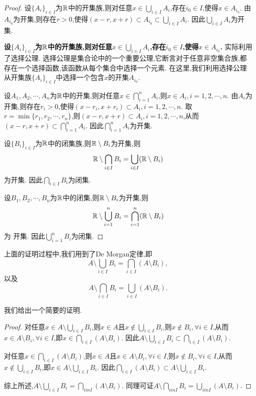 \begin{proof}
    设$\{ A_i \}_{i \in I}$为$\mathbb{R}$中的开集族,则对任意$x \in \bigcup_{i \in I} A_i$,存在$i_0 \in I$,使得$x \in A_{i_0}$. 由$A_{i_0}$为开集,则存在$r > 0$,使得$(x-r,x+r) \subset A_{i_0} \subset \bigcup_{i \in I} A_i$. 因此$\bigcup_{i \in I} A_i$为开集.

\begin{remark}
    \textbf{设$\{ A_i \}_{i \in I}$为$\mathbb{R}$中的开集族,则对任意$x \in \bigcup_{i \in I} A_i$,存在$i_0 \in I$,使得$x \in A_{i_0}$.} 实际利用了选择公理. 选择公理是集合论中的一个重要公理,它断言对于任意非空集合族,都存在一个选择函数,该函数从每个集合中选择一个元素. 在这里,我们利用选择公理从开集族$\{ A_i \}_{i \in I}$中选择一个包含$x$的开集$A_{i_0}$.    
\end{remark}

    设$A_1,A_2,\cdots,A_n$为$\mathbb{R}$中的开集,则对任意$x \in \bigcap_{i=1}^n A_i$,则$x \in A_i, i=1,2,\cdots,n$. 由$A_i$为开集,则存在$r_i > 0$,使得$(x-r_i,x+r_i) \subset A_i, i=1,2,\cdots,n$. 取$r = \min\{r_1,r_2,\cdots,r_n\}$,则$(x-r,x+r) \subset A_i, i=1,2,\cdots,n$,从而$(x-r,x+r) \subset \bigcap_{i=1}^n A_i$. 因此$\bigcap_{i=1}^n A_i$为开集.

    设$\{ B_i \}_{i \in I}$为$\mathbb{R}$中的闭集族,则$\mathbb{R} \setminus B_i$为开集,则$$\mathbb{R} \setminus \bigcap_{i \in I} B_i = \bigcup_{i \in I} (\mathbb{R} \setminus B_i)$$为开集. 因此$\bigcap_{i \in I} B_i$为闭集.

    设$B_1,B_2,\cdots,B_n$为$\mathbb{R}$中的闭集,则$\mathbb{R} \setminus B_i$为开集,则$$\mathbb{R} \setminus \bigcup_{i=1}^n B_i = \bigcap_{i=1}^n (\mathbb{R} \setminus B_i)$$为
    开集. 因此$\bigcup_{i=1}^n B_i$为闭集.
\end{proof}


上面的证明过程中,我们用到了De Morgan定律,即$$A \setminus \bigcup_{i \in I} B_i = \bigcap_{i \in I} (A \setminus B_i),$$以及$$A \setminus \bigcap_{i \in I} B_i = \bigcup_{i \in I} (A \setminus B_i).$$

我们给出一个简要的证明.
\begin{proof}
    对任意$x \in A \setminus \bigcup_{i \in I} B_i$,则$x \in A$且$x \notin \bigcup_{i \in I} B_i$,则$x \notin B_i, \forall i \in I$,从而$x \in A \setminus B_i, \forall i \in I$,即$x \in \bigcap_{i \in I} (A \setminus B_i)$. 因此$A \setminus \bigcup_{i \in I} B_i \subset \bigcap_{i \in I} (A \setminus B_i)$.

    对任意$x \in \bigcap_{i \in I} (A \setminus B_i)$,则$x \in A$且$x \in A \setminus B_i, \forall i \in I$,则$x \notin B_i, \forall i \in I$,从而$x \notin \bigcup_{i \in I} B_i$,即$x \in A \setminus \bigcup_{i \in I} B_i$. 因此$\bigcap_{i \in I} (A \setminus B_i)  \subset A \setminus \bigcup_{i \in I} B_i$.

    综上所述,$A \setminus \bigcup_{i \in I} B_i = \bigcap_{i in I} (A \setminus B_i)$.
    同理可证$A \setminus \bigcap_{i in I} B_i = \bigcup_{i in I} (A \setminus B_i)$.
\end{proof}

